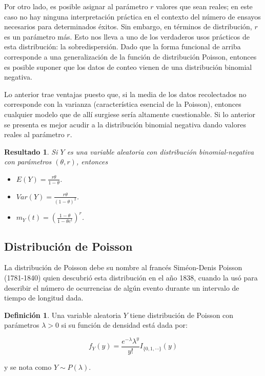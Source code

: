 \documentclass[
  10pt,
  spanish,
]{book}
\providecommand{\tightlist}{%
  \setlength{\itemsep}{0pt}\setlength{\parskip}{0pt}}
\newtheorem{proposition}{Resultado}[chapter]
\theoremstyle{definition}
\newtheorem{definition}{Definición}[chapter]
\theoremstyle{definition}
\theoremstyle{definition}
\theoremstyle{definition}
\theoremstyle{remark}
\begin{document}
Por otro lado, es posible asignar al parámetro \(r\) valores que sean reales; en este caso no hay ninguna interpretación práctica en el contexto del número de ensayos necesarios para determinados éxitos. Sin embargo, en términos de distribución, \(r\) es un parámetro más. Esto nos lleva a uno de los verdaderos usos prácticos de esta distribución: la sobredispersión. Dado que la forma funcional de arriba corresponde a una generalización de la función de distribución Poisson, entonces es posible suponer que los datos de conteo vienen de una distribución binomial negativa.

Lo anterior trae ventajas puesto que, si la media de los datos recolectados no corresponde con la varianza (característica esencial de la Poisson), entonces cualquier modelo que de allí surgiese sería altamente cuestionable. Si lo anterior se presenta es mejor acudir a la distribución binomial negativa dando valores reales al parámetro \(r\).

\begin{proposition}
\protect\hypertarget{prp:unnamed-chunk-12}{}{\label{prp:unnamed-chunk-12} }Si \(Y\) es una variable aleatoria con distribución binomial-negativa con parámetros \((\theta, r)\), entonces

\begin{itemize}
\tightlist
\item
  \(E(Y)=\frac{r\theta}{1-\theta}\).
\item
  \(Var(Y)=\frac{r\theta}{(1-\theta)^2}\).
\item
  \(m_Y(t)=\left(\frac{1-\theta}{1-\theta e^t}\right)^r\).
\end{itemize}
\end{proposition}

\hypertarget{distribuciuxf3n-de-poisson}{%
\subsection{Distribución de Poisson}\label{distribuciuxf3n-de-poisson}}

La distribución de Poisson debe su nombre al francés Siméon-Denis Poisson (1781-1840) quien descubrió esta distribución en el año 1838, cuando
la usó para describir el número de ocurrencias de algún evento durante un intervalo de tiempo de longitud dada.

\begin{definition}
\protect\hypertarget{def:unnamed-chunk-13}{}{\label{def:unnamed-chunk-13} }Una variable aleatoria \(Y\) tiene distribución de Poisson con parámetros \(\lambda>0\) si su función de densidad está dada por:

\begin{equation}
f_Y(y)=\frac{e^{-\lambda}\lambda^y}{y!}I_{\{0,1,\cdots\}}(y)
\end{equation}

y se nota como \(Y\sim P(\lambda)\).
\end{definition}
\end{document}
